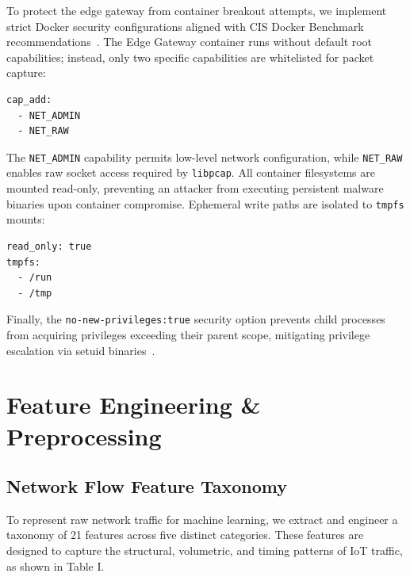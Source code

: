 \documentclass[journal]{IEEEtran}
\begin{document}
To protect the edge gateway from container breakout attempts,
we implement strict Docker security configurations aligned with
CIS Docker Benchmark recommendations~\cite{combe2016docker, sultan2019container, zhao2022container}.
The Edge Gateway container runs without default root
capabilities; instead, only two specific capabilities are
whitelisted for packet capture:

\begin{verbatim}
cap_add:
  - NET_ADMIN
  - NET_RAW
\end{verbatim}

The \texttt{NET\_ADMIN} capability permits low-level network
configuration, while \texttt{NET\_RAW} enables raw socket access
required by \texttt{libpcap}. All container filesystems are mounted
read-only, preventing an attacker from executing persistent
malware binaries upon container compromise. Ephemeral
write paths are isolated to \texttt{tmpfs} mounts:

\begin{verbatim}
read_only: true
tmpfs:
  - /run
  - /tmp
\end{verbatim}

Finally, the \texttt{no-new-privileges:true} security option
prevents child processes from acquiring privileges exceeding
their parent scope, mitigating privilege escalation via setuid
binaries~\cite{sultan2019container}.

\section{Feature Engineering & Preprocessing}

\subsection{Network Flow Feature Taxonomy}
To represent raw network traffic for machine learning, we extract and engineer a taxonomy of 21 features across five distinct categories. These features are designed to capture the structural, volumetric, and timing patterns of IoT traffic, as shown in Table I.
\end{document}
